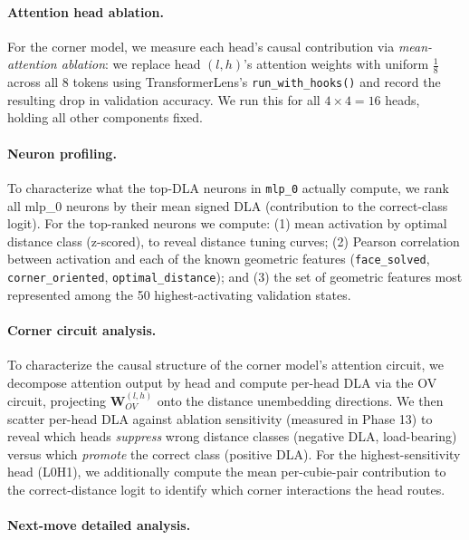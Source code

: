 \documentclass[12pt]{article}
\begin{document}
\paragraph{Attention head ablation.}

For the corner model, we measure each head's causal contribution via
\emph{mean-attention ablation}: we replace head $(l, h)$'s attention weights with
uniform $\tfrac{1}{8}$ across all 8 tokens using TransformerLens's
\texttt{run\_with\_hooks()} and record the resulting drop in validation accuracy.
We run this for all $4 \times 4 = 16$ heads, holding all other components fixed.

\paragraph{Neuron profiling.}

To characterize what the top-DLA neurons in \texttt{mlp\_0} actually compute, we
rank all mlp\_0 neurons by their mean signed DLA (contribution to the
correct-class logit).  For the top-ranked neurons we compute: (1) mean activation
by optimal distance class (z-scored), to reveal distance tuning curves; (2)
Pearson correlation between activation and each of the known geometric features
(\texttt{face\_solved}, \texttt{corner\_oriented}, \texttt{optimal\_distance});
and (3) the set of geometric features most represented among the 50
highest-activating validation states.

\paragraph{Corner circuit analysis.}

To characterize the causal structure of the corner model's attention circuit, we
decompose attention output by head and compute per-head DLA via the OV circuit,
projecting $\mathbf{W}_{OV}^{(l,h)}$ onto the distance unembedding directions.
We then scatter per-head DLA against ablation sensitivity (measured in Phase 13)
to reveal which heads \emph{suppress} wrong distance classes (negative DLA,
load-bearing) versus which \emph{promote} the correct class (positive DLA).  For
the highest-sensitivity head (L0H1), we additionally compute the mean per-cubie-pair
contribution to the correct-distance logit to identify which corner interactions
the head routes.

\paragraph{Next-move detailed analysis.}
\end{document}
